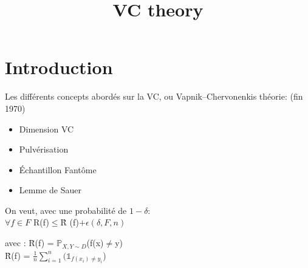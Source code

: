 \documentclass[a4paper]{report}
\title{VC theory}
\begin{document}
\maketitle
\tableofcontents

\renewcommand{\thesection}{\arabic{section}}

\newtheorem{theorem}{Theorem}
\newtheorem{lemma}{Lemme}

\renewcommand{\thetheorem}{\empty{}}
\renewcommand{\thelemma}{\empty{}} 

\newenvironment{proof}[1][Proof]{\begin{trivlist}
\item[\hskip \labelsep {\bfseries #1}]}{\end{trivlist}}
\newenvironment{definition}[1][Definition]{\begin{trivlist}
\item[\hskip \labelsep {\bfseries #1}]}{\end{trivlist}}
\newenvironment{example}[1][Example]{\begin{trivlist}
\item[\hskip \labelsep {\bfseries #1}]}{\end{trivlist}}
\newenvironment{remark}[1][Rq:]{\begin{trivlist}
\item[\hskip \labelsep {\bfseries #1}]}{\end{trivlist}}


\chapter*{Introduction}
Les différents concepts abordés sur la VC, ou Vapnik–Chervonenkis théorie: (fin 1970)
\begin{itemize}
\item Dimension VC
\item Pulvérisation
\item Échantillon Fantôme
\item Lemme de Sauer
\end{itemize}
On veut, avec une probabilité de $1 - \delta$:\\
$ \forall f \in F $ R(f)$ \leq $\^R (f)$ + \epsilon(\delta, F, n) $\\
\begin{tabbing}
avec : \= R(f) = $\mathds{P}_{X,Y \sim D}$(f(x)$\neq$y)\\
\> \^R(f) = $\frac{1}{n}\displaystyle { \sum_{i=1}^{n}}( \mathds{1}_{f(x_i)\neq y_i} $)\\
\end{tabbing}
\end{document}
